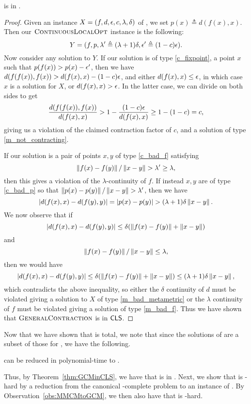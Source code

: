 \begin{theorem}
\label{thm:GCMinCLS}
  \GCM is in \CLS.
\end{theorem}
\begin{proof}
  Given an instance $X=(f,d,\epsilon,c,\lambda,\delta)$ of \GCM, we set $p(x) \triangleq d(f(x),x)$. Then our $\textsc{ContinuousLocalOpt}$ instance is the following:
  \[Y=(f, p, \lambda' \triangleq (\lambda + 1) \delta, \epsilon' \triangleq (1-c)\epsilon).\]
%
Now consider any solution to $Y$. If our solution is of type \ref{c_fixpoint}, a
	point $x$ such that $p(f(x)) > p(x) - \epsilon'$, then we have $d(f(f(x)),f(x))
	> d(f(x),x) - (1-c)\epsilon$, and either $d(f(x),x) \leq \epsilon$, in which case $x$ is
	a solution for $X$, or $d(f(x),x) > \epsilon$. In the latter case, we can divide
	on both sides to get \[ \frac{d(f(f(x)),f(x))}{d(f(x),x)} > 1-
	\frac{(1-c)\epsilon}{d(f(x),x)} \geq 1- (1-c) = c\text{,} \] giving us a violation
	of the claimed contraction factor of $c$, and a solution of type
	\ref{m_not_contracting}.

If our solution is a pair of points $x,y$ of type \ref{c_bad_f} satisfying \[\left\| f(x) - f(y) \right\|/\left\| x-y \right\| > \lambda' \geq \lambda\text{,}\] then this gives a violation of the $\lambda$-continuity of $f$. If instead $x,y$ are of type \ref{c_bad_p} so that $\left\| p(x) - p(y) \right\|/\left\| x-y \right\| > \lambda'$, then we have
\[ \left| d(f(x),x) - d(f(y),y) \right| = \left| p(x) - p(y) \right| > (\lambda+1)\delta \left\| x-y \right\|\text{.} \]
%  
We now observe that if
\[ \left| d(f(x),x) - d(f(y),y) \right| \leq \delta (\left\| f(x)-f(y) \right\| + \left\| x - y \right\|) \] and \[ \left\| f(x) - f(y) \right\|/\left\| x-y \right\| \leq \lambda,\] 
	then we would have
\[\left| d(f(x),x) - d(f(y),y) \right| \leq \delta (\left\| f(x) - f(y) \right\| + \left\| x-y \right\|) \leq (\lambda + 1)\delta \left\| x-y \right\|,\] 
which contradicts the above inequality, so either the $\delta$ continuity of $d$ must be violated giving a solution to $X$ of type \ref{m_bad_metametric} or the $\lambda$ continuity of $f$ must be violated giving a solution of type \ref{m_bad_f}.
%
Thus we have shown that $\textsc{GeneralContraction}$ is in $\mathsf{CLS}$.
\end{proof}

Now that we have shown that \GCM is total, we note 
that since the solutions of \GCM are a subset of those for \MMCM, we have the following.

\begin{observation}
\label{obs:MMCMtoGCM}
\MMCM can be reduced in polynomial-time to \GCM.
\end{observation}

Thus, by Theorem~\ref{thm:GCMinCLS}, we have that \MMCM is in \CLS.
%
Next, we show that \MMCM is \CLS-hard by a reduction 
from the canonical \CLS-complete problem \CLO to an instance of \MMCM.
By Observation~\ref{obs:MMCMtoGCM}, we then also have that \GCM is \CLS-hard.

